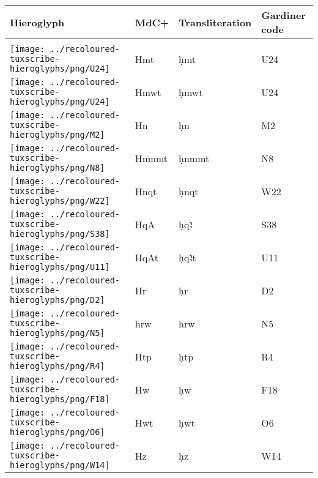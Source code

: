 \begin{center}
	\begin{tabularx}{\linewidth}{YYYY}
		Hieroglyph & MdC+ & Transliteration & Gardiner code\\
		\hline\\
		\texttt{[image: ../recoloured-tuxscribe-hieroglyphs/png/U24]} & Hmt & ḥmt & U24 \\ 
		\texttt{[image: ../recoloured-tuxscribe-hieroglyphs/png/U24]} & Hmwt & ḥmwt & U24 \\ 
		\texttt{[image: ../recoloured-tuxscribe-hieroglyphs/png/M2]} & Hn & ḥn & M2 \\ 
		\texttt{[image: ../recoloured-tuxscribe-hieroglyphs/png/N8]} & Hnmmt & ḥnmmt & N8 \\ 
		\texttt{[image: ../recoloured-tuxscribe-hieroglyphs/png/W22]} & Hnqt & ḥnqt & W22 \\ 
		\texttt{[image: ../recoloured-tuxscribe-hieroglyphs/png/S38]} & HqA & ḥqꜣ & S38 \\ 
		\texttt{[image: ../recoloured-tuxscribe-hieroglyphs/png/U11]} & HqAt & ḥqꜣt & U11 \\ 
		\texttt{[image: ../recoloured-tuxscribe-hieroglyphs/png/D2]} & Hr & ḥr & D2 \\ 
		\texttt{[image: ../recoloured-tuxscribe-hieroglyphs/png/N5]} & hrw & hrw & N5 \\ 
		\vspace{0.22500cm} \texttt{[image: ../recoloured-tuxscribe-hieroglyphs/png/R4]} \vspace{0.22500cm} & Htp & ḥtp & R4 \\ 
		\vspace{0.22500cm} \texttt{[image: ../recoloured-tuxscribe-hieroglyphs/png/F18]} \vspace{0.22500cm} & Hw & ḥw & F18 \\ 
		\texttt{[image: ../recoloured-tuxscribe-hieroglyphs/png/O6]} & Hwt & ḥwt & O6 \\ 
		\texttt{[image: ../recoloured-tuxscribe-hieroglyphs/png/W14]} & Hz & ḥz & W14 \\ 
	\end{tabularx}
\end{center}


